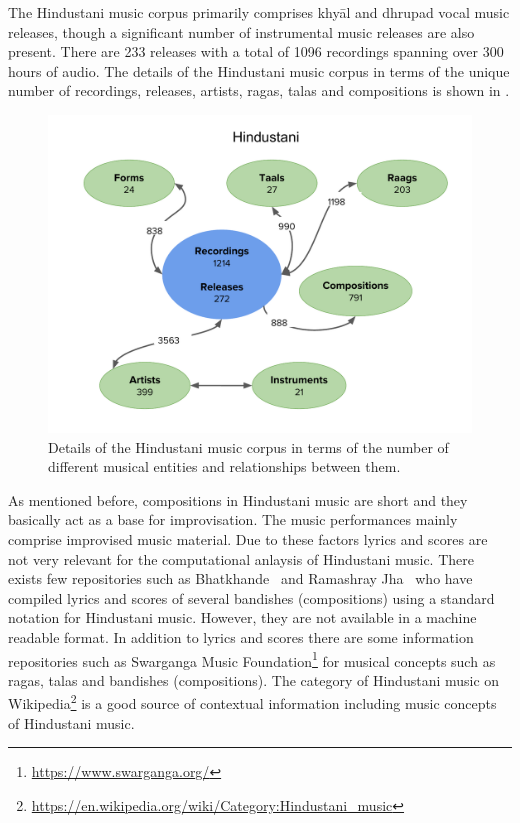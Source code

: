 The Hindustani music corpus primarily comprises khy\={a}l and dhrupad vocal music releases, though a significant number of instrumental music releases are also present. There are 233 releases with a total of 1096 recordings spanning over 300 hours of audio. The details of the Hindustani music corpus in terms of the unique number of recordings, releases, artists, \glspl{raga}, \glspl{tala} and compositions is shown in .


\begin{figure}
	\begin{center}
		\includegraphics[width=\figSizeHundred]{ch04_datasets/figures/hindustani_corpus.pdf}
	\end{center}
	\caption[Details of the Hindustani music corpus]{Details of the Hindustani music corpus in terms of the number of different musical entities and relationships between them.}
	\label{fig:hindustani_corpus_details}
\end{figure}


As mentioned before, compositions in Hindustani music are short and they basically act as a base for improvisation. The music performances mainly comprise improvised music material. Due to these factors lyrics and scores are not very relevant for the computational anlaysis of Hindustani music. There exists few repositories such as Bhatkhande~\citep{Bhatkhande_1990} and Ramashray Jha~\citep{R_Jha_2001} who have compiled lyrics and scores of several bandishes (compositions) using a standard notation for Hindustani music. However, they are not available in a machine readable format. In addition to lyrics and scores there are some information repositories such as Swarganga Music Foundation\footnote{\url{https://www.swarganga.org/}} for musical concepts such as \glspl{raga}, \glspl{tala} and bandishes (compositions). The category of Hindustani music on Wikipedia\footnote{\url{https://en.wikipedia.org/wiki/Category:Hindustani_music}} is a good source of contextual information including music concepts of Hindustani music.

